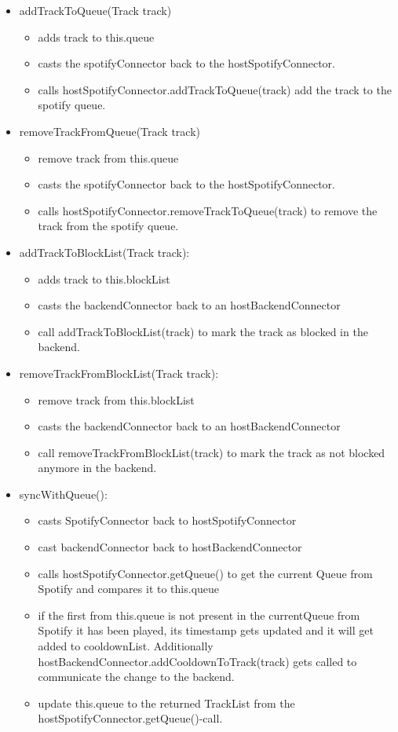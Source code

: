 \documentclass[oneside, nenglish]{sdqtechreport}
\begin{document}
\begin{itemize}
    \item addTrackToQueue(Track track)
    \begin{itemize}
        \item adds track to this.queue 
        \item casts the spotifyConnector back to the hostSpotifyConnector.
        \item calls hostSpotifyConnector.addTrackToQueue(track) add the track to the spotify queue.
    \end{itemize}
    \item removeTrackFromQueue(Track track)
    \begin{itemize}
        \item remove track from this.queue 
        \item casts the spotifyConnector back to the hostSpotifyConnector.
        \item calls hostSpotifyConnector.removeTrackToQueue(track) to remove the track from the spotify queue.
    \end{itemize}
    \item addTrackToBlockList(Track track):
    \begin{itemize}
        \item adds track to this.blockList
        \item casts the backendConnector back to an hostBackendConnector
        \item call addTrackToBlockList(track) to mark the track as blocked in the backend.
    \end{itemize}
    \item removeTrackFromBlockList(Track track):
    \begin{itemize}
        \item remove track from this.blockList
        \item casts the backendConnector back to an hostBackendConnector
        \item call removeTrackFromBlockList(track) to mark the track as not blocked anymore in the backend.
    \end{itemize}
    \item syncWithQueue(): 
    \begin{itemize}
        \item casts SpotifyConnector back to hostSpotifyConnector
        \item cast backendConnector back to hostBackendConnector
        \item calls hostSpotifyConnector.getQueue() to get the current Queue from Spotify and compares it to this.queue
        \item if the first from this.queue is not present in the currentQueue from Spotify it has been played, its timestamp gets updated and it will get added to cooldownList. Additionally hostBackendConnector.addCooldownToTrack(track) gets called to communicate the change to the backend.
        \item update this.queue to the returned TrackList from the hostSpotifyConnector.getQueue()-call.
    \end{itemize}


\end{itemize}
\end{document}
